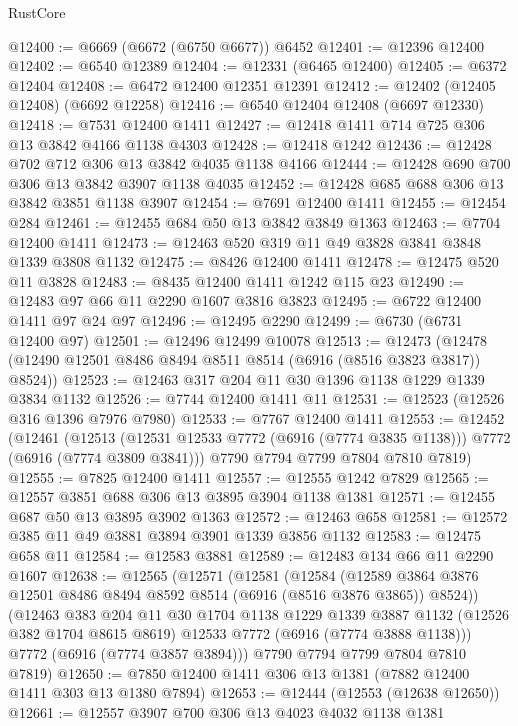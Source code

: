 \begin{lexlean}{RustCore}
\begin{coremodule}
@12400 := @6669 (@6672 (@6750 @6677)) @6452
@12401 := @12396 @12400
@12402 := @6540 @12389
@12404 := @12331 (@6465 @12400)
@12405 := @6372 @12404
@12408 := @6472 @12400 @12351 @12391
@12412 := @12402 (@12405 @12408) (@6692 @12258)
@12416 := @6540 @12404 @12408 (@6697 @12330)
@12418 := @7531 @12400 @1411
@12427 := @12418 @1411 @714 @725 @306 @13 @3842 @4166 @1138 @4303
@12428 := @12418 @1242
@12436 := @12428 @702 @712 @306 @13 @3842 @4035 @1138 @4166
@12444 := @12428 @690 @700 @306 @13 @3842 @3907 @1138 @4035
@12452 := @12428 @685 @688 @306 @13 @3842 @3851 @1138 @3907
@12454 := @7691 @12400 @1411
@12455 := @12454 @284
@12461 := @12455 @684 @50 @13 @3842 @3849 @1363
@12463 := @7704 @12400 @1411
@12473 := @12463 @520 @319 @11 @49 @3828 @3841 @3848 @1339 @3808 @1132
@12475 := @8426 @12400 @1411
@12478 := @12475 @520 @11 @3828
@12483 := @8435 @12400 @1411 @1242 @115 @23
@12490 := @12483 @97 @66 @11 @2290 @1607 @3816 @3823
@12495 := @6722 @12400 @1411 @97 @24 @97
@12496 := @12495 @2290
@12499 := @6730 (@6731 @12400 @97)
@12501 := @12496 @12499 @10078
@12513 := @12473 (@12478 (@12490 @12501 @8486 @8494 @8511 @8514 (@6916 (@8516 @3823 @3817)) @8524))
@12523 := @12463 @317 @204 @11 @30 @1396 @1138 @1229 @1339 @3834 @1132
@12526 := @7744 @12400 @1411 @11
@12531 := @12523 (@12526 @316 @1396 @7976 @7980)
@12533 := @7767 @12400 @1411
@12553 := @12452
    (@12461
      (@12513 (@12531 @12533 @7772 (@6916 (@7774 @3835 @1138))) @7772 (@6916 (@7774 @3809 @3841)))
      @7790
      @7794
      @7799
      @7804
      @7810
      @7819)
@12555 := @7825 @12400 @1411
@12557 := @12555 @1242 @7829
@12565 := @12557 @3851 @688 @306 @13 @3895 @3904 @1138 @1381
@12571 := @12455 @687 @50 @13 @3895 @3902 @1363
@12572 := @12463 @658
@12581 := @12572 @385 @11 @49 @3881 @3894 @3901 @1339 @3856 @1132
@12583 := @12475 @658 @11
@12584 := @12583 @3881
@12589 := @12483 @134 @66 @11 @2290 @1607
@12638 := @12565
    (@12571
      (@12581
        (@12584
          (@12589 @3864 @3876 @12501 @8486 @8494 @8592 @8514 (@6916 (@8516 @3876 @3865)) @8524))
        (@12463
          @383
          @204
          @11
          @30
          @1704
          @1138
          @1229
          @1339
          @3887
          @1132
          (@12526 @382 @1704 @8615 @8619)
          @12533
          @7772
          (@6916 (@7774 @3888 @1138)))
        @7772
        (@6916 (@7774 @3857 @3894)))
      @7790
      @7794
      @7799
      @7804
      @7810
      @7819)
@12650 := @7850 @12400 @1411 @306 @13 @1381 (@7882 @12400 @1411 @303 @13 @1380 @7894)
@12653 := @12444 (@12553 (@12638 @12650))
@12661 := @12557 @3907 @700 @306 @13 @4023 @4032 @1138 @1381

\end{coremodule}
\end{lexlean}
